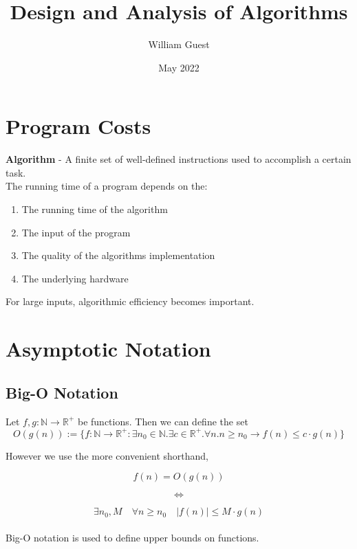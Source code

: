 \documentclass{article}
\title{Design and Analysis of Algorithms}
\author{William Guest}
\date{May 2022}
\begin{document}
\maketitle

\section{Program Costs}
    \textbf{Algorithm} - A finite set of well-defined instructions used to accomplish a certain task. \\
    
    The running time of a program depends on the:
    \begin{enumerate}
        \item The running time of the algorithm
        \item The input of the program
        \item The quality of the algorithms implementation
        \item The underlying hardware
    \end{enumerate}
    For large inputs, algorithmic efficiency becomes important.

\section{Asymptotic Notation}
    \subsection{Big-O Notation}
        Let $f,g: \mathbb{N} \to \mathbb{R}^+$ be functions. Then we can define the set
        \[ O(g(n)) := \{ f: \mathbb{N} \to \mathbb{R}^+ : \exists n_0 \in \mathbb{N} . \exists c \in \mathbb{R}^+ . \forall n . n \geq n_0 \to f(n) \leq c \cdot g(n) \} \]
        
        However we use the more convenient shorthand,
        
        \[  f(n) = O(g(n))\]
        
        \[ \iff \]
        
        \[ \exists n_0, M \quad \forall n \geq n_0 \quad |f(n)| \leq M \cdot g(n)  \]
        \\
        Big-O notation is used to define upper bounds on functions.
\end{document}
